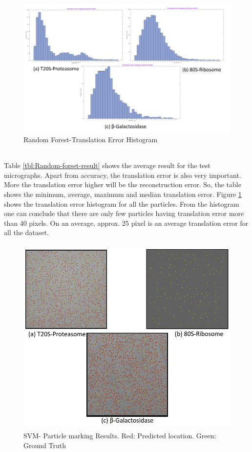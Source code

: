 \documentclass{report}
\begin{document}
\begin{figure}[H]
\includegraphics[width=1\linewidth]{rf-all-Translation_Error_Histogram.png}
\centering
\captionsetup{justification=centering}
\caption{Random Forest-Translation Error Histogram}
\label{fig: RF-Translation_Error_Histogram}
\end{figure}

\noindent\\
Table \ref{tbl:Random-forset-result} shows the average result for the test micrographs. Apart from accuracy, the translation error is also very important. More the translation error higher will be the reconstruction error. So, the table shows the minimum, average, maximum and median translation error. Figure \ref{fig: RF-Translation_Error_Histogram} shows the translation error histogram for all the particles. From the histogram one can conclude that there are only few particles having translation error more than 40 pixels. On an average, approx. 25 pixel is an average translation error for all the dataset. 

\begin{figure}[H]
\includegraphics[width=0.98\linewidth,height=10cm]{rf-all-result.png}
\centering
\captionsetup{justification=centering}
\caption{SVM- Particle marking Results. Red: Predicted location. Green: Ground Truth}
\label{fig:RF-micrograph-marking}
\end{figure}
\end{document}
